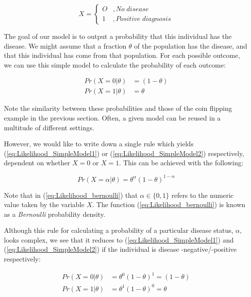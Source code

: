 \documentclass[11pt,fullpage]{book}
\begin{document}
\begin{equation}
X =
\begin{cases}
O & , No\; disease \\
1 & , Positive \; diagnosis
\end{cases}
\end{equation}

The goal of our model is to output a probability that this individual has the disease. We might assume that a fraction $\theta$ of the population has the disease, and that this individual has come from that population. For each possible outcome, we can use this simple model to calculate the probability of each outcome:

\begin{align}\label{eq:Likelihood_SimpleModel1}
Pr(X = 0|\theta)& = (1-\theta)\\
Pr(X = 1|\theta)& = \theta\label{eq:Likelihood_SimpleModel2}
\end{align}

Note the similarity between these probabilities and those of the coin flipping example in the previous section. Often, a given model can be reused in a multitude of different settings.

However, we would like to write down a single rule which yields (\ref{eq:Likelihood_SimpleModel1}) or (\ref{eq:Likelihood_SimpleModel2}) respectively, dependent on whether $X=0$ or $X=1$. This can be achieved with the following:

\begin{equation}\label{eq:Likelihood_bernoulli}
Pr(X=\alpha|\theta) = \theta^\alpha(1-\theta)^{1-\alpha}
\end{equation}

Note that in (\ref{eq:Likelihood_bernoulli}) that $\alpha\in\{0,1\}$ refers to the numeric value taken by the variable $X$. The function (\ref{eq:Likelihood_bernoulli}) is known as a \textit{Bernoulli} probability density.

Although this rule for calculating a probability of a particular disease status, $\alpha$, looks complex, we see that it reduces to (\ref{eq:Likelihood_SimpleModel1}) and (\ref{eq:Likelihood_SimpleModel2}) if the individual is disease -negative/-positive respectively:

\begin{align}\label{eq:Likelihood_SimpleModel3}
Pr(X = 0|\theta)& = \theta^0(1-\theta)^1 = (1-\theta)\\
Pr(X = 1|\theta)& = \theta^1(1-\theta)^0 = \theta\label{eq:Likelihood_SimpleModel4}
\end{align}
\end{document}
